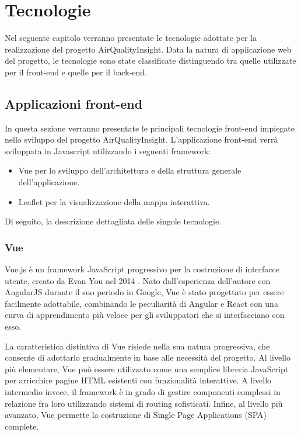 \clearpage{\pagestyle{empty}\cleardoublepage}

\chapter{Tecnologie}

Nel seguente capitolo verranno presentate le tecnologie adottate per la realizzazione del progetto AirQualityInsight. Data la natura di applicazione web del progetto, le tecnologie sono state classificate distinguendo tra quelle utilizzate per il front-end e quelle per il back-end.

\section{Applicazioni front-end}

In questa sezione verranno presentate le principali tecnologie front-end impiegate nello sviluppo del progetto AirQualityInsight.
L'applicazione front-end verrà sviluppata in Javascript utilizzando i seguenti framework:
\begin{itemize}
  \item Vue per lo sviluppo dell'architettura e della struttura generale dell'applicazione.
  \item Leaflet per la visualizzazione della mappa interattiva.
\end{itemize}

Di seguito, la descrizione dettagliata delle singole tecnologie.

\subsection{Vue}

Vue.js è un framework JavaScript progressivo per la costruzione di interfacce utente, creato da Evan You nel 2014 \cite{vue2014}. Nato dall'esperienza dell'autore con AngularJS \cite{angularjs2010} durante il suo periodo in Google, Vue è stato progettato per essere facilmente adottabile, combinando le peculiarità di Angular e React \cite{react2013} con una curva di apprendimento più veloce per gli sviluppatori che si interfacciano con esso.

La caratteristica distintiva di Vue risiede nella sua natura progressiva, che consente di adottarlo gradualmente in base alle necessità del progetto. Al livello più elementare, Vue può essere utilizzato come una semplice libreria JavaScript per arricchire pagine HTML esistenti con funzionalità interattive. A livello intermedio invece, il framework è in grado di gestire componenti complessi in relazione fra loro utilizzando sistemi di routing sofisticati. Infine, al livello più avanzato, Vue permette la costruzione di Single Page Applications (SPA) \cite{mdn2024spa} complete.

